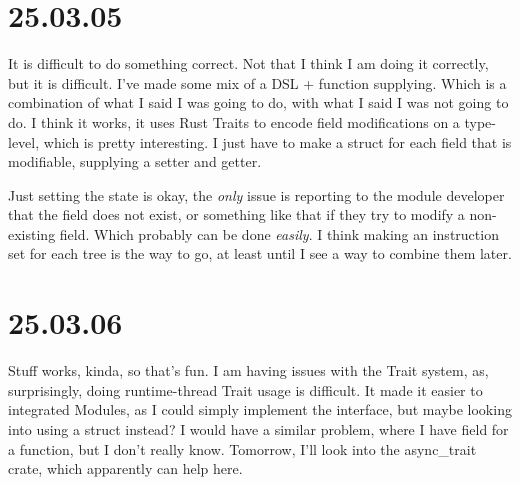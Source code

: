 \section{25.03.05}

It is difficult to do something correct. Not that I think I am doing it
correctly, but it is difficult. I've made some mix of a DSL + function
supplying. Which is a combination of what I said I was going to do, with what I
said I was not going to do. I think it works, it uses Rust Traits to encode
field modifications on a type-level, which is pretty interesting. I just have to
make a struct for each field that is modifiable, supplying a setter and getter.

Just setting the state is okay, the \textit{only} issue is reporting to
the module developer that the field does not exist, or something like that if
they try to modify a non-existing field. Which probably can be done
\textit{easily}. I think making an instruction set for each tree is the way to
go, at least until I see a way to combine them later.

\section{25.03.06}

Stuff works, kinda, so that's fun. I am having issues with the Trait system, as,
surprisingly, doing runtime-thread Trait usage is difficult. It made it easier
to integrated Modules, as I could simply implement the interface, but maybe
looking into using a struct instead? I would have a similar problem, where I
have field for a function, but I don't really know. Tomorrow, I'll look into
the async_trait crate, which apparently can help here.
